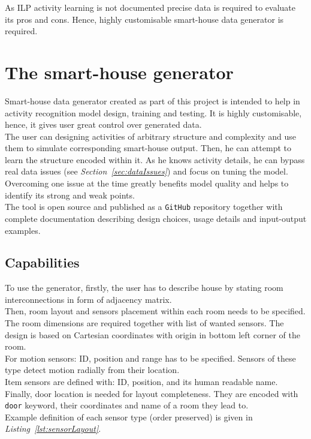 \documentclass[12pt, a4paper, pdflatex, leqno, twoside, openright]{report}
\begin{document}
As ILP activity learning is not documented precise data is required to evaluate its pros and cons. Hence, highly customisable smart-house data generator is required.

  \section{The smart-house generator}
Smart-house data generator created as part of this project is intended to help in activity recognition model design, training and testing. It is highly customisable, hence, it gives user great control over generated data.\\

The user can designing activities of arbitrary structure and complexity and use them to simulate corresponding smart-house output. Then, he can attempt to learn the structure encoded within it. As he knows activity details, he can bypass real data issues (see \emph{Section~\ref{sec:dataIssues}}) and focus on tuning the model. Overcoming one issue at the time greatly benefits model quality and helps to identify its strong and weak points.\\

The tool is open source and published as a \texttt{GitHub} repository together with complete documentation describing design choices, usage details and input-output examples.

    \subsection{Capabilities}
To use the generator, firstly, the user has to describe house by stating room interconnections in form of adjacency matrix.\\

Then, room layout and sensors placement within each room needs to be specified. The room dimensions are required together with list of wanted sensors. The design is based on Cartesian coordinates with origin in bottom left corner of the room.\\
For motion sensors: ID, position and range has to be specified. Sensors of these type detect motion radially from their location.\\
Item sensors are defined with: ID, position, and its human readable name.\\
Finally, door location is needed for layout completeness. They are encoded with \texttt{door} keyword, their coordinates and name of a room they lead to.\\
Example definition of each sensor type (order preserved) is given in \emph{Listing~\ref{lst:sensorLayout}}.\\
\end{document}
